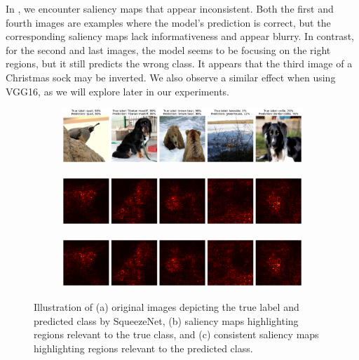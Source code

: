 In , we encounter saliency maps that appear inconsistent. Both the first and fourth images are examples where the model's prediction is correct, but the corresponding saliency maps lack informativeness and appear blurry. In contrast, for the second and last images, the model seems to be focusing on the right regions, but it still predicts the wrong class. 
It appears that the third image of a Christmas sock may be inverted. We also observe a similar effect when using VGG16, as we will explore later in our experiments.

\begin{figure}[H]
    \centering
    \begin{subfigure}{0.95\textwidth}
        \includegraphics[width=\textwidth]{good_images}
        \caption{}
        \label{subfig:good_images1}
    \end{subfigure}
    \begin{subfigure}{0.95\textwidth}
        \includegraphics[width=\textwidth]{good_true_class_saliency}
        \caption{}
        \label{subfig:good_true_class_saliency}
    \end{subfigure}
    \begin{subfigure}{0.95\textwidth}
        \includegraphics[width=\textwidth]{good_predicted_class_saliency}
        \caption{}
        \label{subfig:good_predicted_class_saliency}
    \end{subfigure}
    \caption{Illustration of (a) original images depicting the true label and predicted class by SqueezeNet, (b) saliency maps highlighting regions relevant to the true class, and (c) consistent saliency maps highlighting regions relevant to the predicted class.}
    \label{fig:good_saliency_map}
\end{figure}

